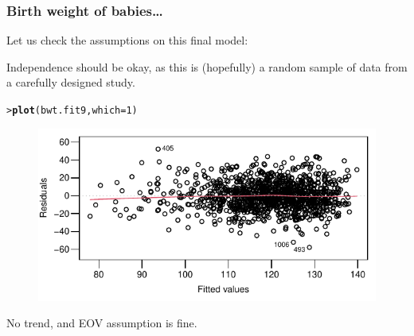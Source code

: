 \documentclass{beamer}\usepackage[]{graphicx}\usepackage[]{xcolor}
\makeatletter
\newcommand{\hlnum}[1]{\textcolor[rgb]{0.686,0.059,0.569}{#1}}%
\newcommand{\hlstd}[1]{\textcolor[rgb]{0.345,0.345,0.345}{#1}}%
\newcommand{\hlkwc}[1]{\textcolor[rgb]{0.333,0.667,0.333}{#1}}%
\newcommand{\hlkwd}[1]{\textcolor[rgb]{0.737,0.353,0.396}{\textbf{#1}}}%
\newenvironment{kframe}{%
 \def\at@end@of@kframe{}%
 \ifinner\ifhmode%
  \def\at@end@of@kframe{\end{minipage}}%
  \begin{minipage}{\columnwidth}%
 \fi\fi%
 \def\FrameCommand##1{\hskip\@totalleftmargin \hskip-\fboxsep
 \colorbox{shadecolor}{##1}\hskip-\fboxsep
     \hskip-\linewidth \hskip-\@totalleftmargin \hskip\columnwidth}%
 \MakeFramed {\advance\hsize-\width
   \@totalleftmargin\z@ \linewidth\hsize
   \@setminipage}}%
 {\par\unskip\endMakeFramed%
 \at@end@of@kframe}
\newenvironment{knitrout}{}{} %
\makeatother
\begin{document}
\begin{frame}[fragile]
\frametitle{Birth weight of babies\ldots}
Let us check the assumptions on this final model:

Independence should be okay, as this is (hopefully) a random sample of data from
a carefully designed study.

\begin{knitrout}\scriptsize
{}\color{fgcolor}\begin{kframe}
\begin{alltt}
\hlstd{> }\hlkwd{plot}\hlstd{(bwt.fit9,}\hlkwc{which}\hlstd{=}\hlnum{1}\hlstd{)}
\end{alltt}
\end{kframe}
\end{knitrout}



\begin{figure}
  \centering
  \includegraphics{figure/RC-H10-050}
\end{figure}

No trend, and EOV assumption is fine.
\end{frame}
\end{document}

